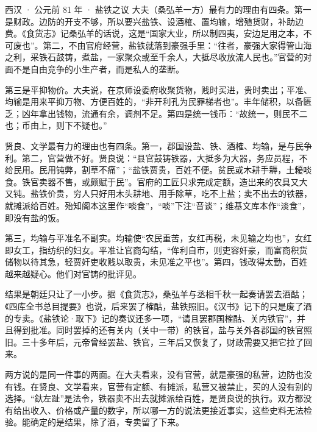 \begin{case}{西汉 · 公元前 81 年 · 盐铁之议}
大夫（桑弘羊一方）最有力的理由有四条。第一是财政。边防的开支不够，所以要兴盐铁、设酒榷、置均输，增殖货财，补助边费\cite{yantielun}。《食货志》记桑弘羊的话说，这是“国家大业，所以制四夷，安边足用之本，不可废也”\cite{hanshu}。第二，不由官府经营，盐铁就落到豪强手里：“往者，豪强大家得管山海之利，采铁石鼓铸，煮盐，一家聚众或至千余人，大抵尽收放流人民也。”\cite{yantielun}官营的对面不是自由竞争的小生产者，而是私人的垄断。

第三是平抑物价。大夫说，在京师设委府收聚货物，贱时买进，贵时卖出；平准、均输是用来平抑万物、方便百姓的，“非开利孔为民罪梯者也”。丰年储积，以备匮乏；凶年拿出钱物，流通有余，调剂不足\cite{yantielun}。第四是统一钱币：“故统一，则民不二也；币由上，则下不疑也。”\cite{yantielun}

贤良、文学最有力的理由也有四条。第一，郡国设盐、铁、酒榷、均输，是与民争利\cite{yantielun}。第二，官营做不好。贤良说：“县官鼓铸铁器，大抵多为大器，务应员程，不给民用。民用钝弊，割草不痛”；“盐铁贾贵，百姓不便。贫民或木耕手耨，土耰啖食。铁官卖器不售，或颇赋于民”\cite{yantielun}。官府的工匠只求完成定额，造出来的农具又大又钝。盐铁价贵，穷人只好用木头耕地、用手除草，吃不上盐；卖不出去的铁器，就摊派给百姓。殆知阁本这里作“啖食”，“啖”下注“音谈”；维基文库本作“淡食”，即没有盐的饭。

第三，均输与平准名不副实。均输使“农民重苦，女红再税，未见输之均也”，女红即女工，指纺织的妇女。平准让官商勾结，“侔利自市，则吏容奸豪，而富商积货储物以待其急，轻贾奸吏收贱以取贵，未见准之平也”\cite{yantielun}。第四，钱改得太勤，百姓越来越疑心\cite{yantielun}。他们对官铸的批评见。

结果是朝廷只让了一小步。据《食货志》，桑弘羊与丞相千秋一起奏请罢去酒酤\cite{hanshu}；《四库全书总目提要》也说，后来罢了榷酤，盐铁照旧\cite{yantielun}。《汉书》记下的只是废了酒的专卖。《盐铁论·取下》记的奏议还多一项，“请且罢郡国榷酤、关内铁官”，并且得到批准\cite{yantielun}。同时罢掉的还有关内（关中一带）的铁官，盐与关外各郡国的铁官照旧。三十多年后，元帝曾经罢盐、铁官，三年后又恢复了\cite{hanshu}，财政需要又把它拉了回来。
\end{case}

两方说的是同一件事的两面。在大夫看来，没有官营，就是豪强的私营，边防也没有钱。在贤良、文学看来，官营有定额、有摊派，私营又被禁止，买的人没有别的选择。“釱左趾”是法令，铁器卖不出去就摊派给百姓，是贤良说的执行。双方都没有给出收入、价格或产量的数字，所以哪一方的说法更接近事实，这些史料无法检验。能确定的是结果，除了酒，专卖留了下来。

